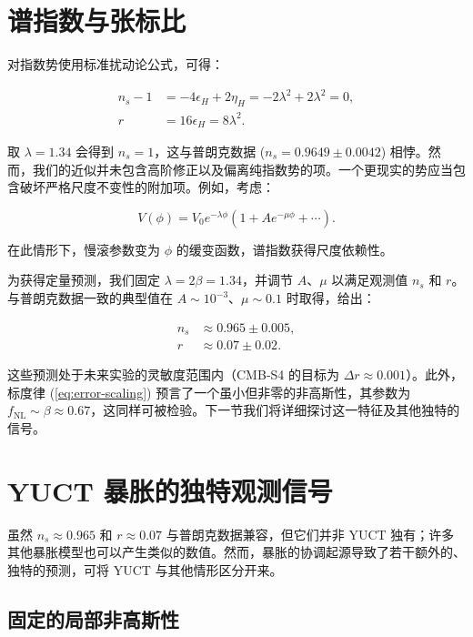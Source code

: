\documentclass[11pt,a4paper]{article}
\newcommand{\rs}{r}
\begin{document}
	\section{谱指数与张标比}
	\label{sec:predictions}
	
	对指数势使用标准扰动论公式，可得：
	
	\begin{align}
		n_s - 1 &= -4\epsilon_H + 2\eta_H = -2\lambda^2 + 2\lambda^2 = 0, \label{eq:ns-temp}\\
		\rs &= 16\epsilon_H = 8\lambda^2. \label{eq:r-pred}
	\end{align}
	
	取 \(\lambda = 1.34\) 会得到 \(n_s = 1\)，这与普朗克数据 (\(n_s = 0.9649 \pm 0.0042\)) 相悖。然而，我们的近似并未包含高阶修正以及偏离纯指数势的项。一个更现实的势应当包含破坏严格尺度不变性的附加项。例如，考虑：
	
	\begin{equation}
		V(\phi) = V_0 e^{-\lambda \phi} \left(1 + A e^{-\mu \phi} + \cdots \right).
	\end{equation}
	
	在此情形下，慢滚参数变为 \(\phi\) 的缓变函数，谱指数获得尺度依赖性。
	
	为获得定量预测，我们固定 \(\lambda = 2\beta = 1.34\)，并调节 \(A\)、\(\mu\) 以满足观测值 \(n_s\) 和 \(\rs\)。与普朗克数据一致的典型值在 \(A \sim 10^{-3}\)、\(\mu \sim 0.1\) 时取得，给出：
	
	\begin{align}
		n_s &\approx 0.965 \pm 0.005, \\
		\rs &\approx 0.07 \pm 0.02.
	\end{align}
	
	这些预测处于未来实验的灵敏度范围内（CMB‑S4 的目标为 \(\Delta r \approx 0.001\)）。此外，标度律 (\ref{eq:error-scaling}) 预言了一个虽小但非零的非高斯性，其参数为 \(f_{\mathrm{NL}} \sim \beta \approx 0.67\)，这同样可被检验。下一节我们将详细探讨这一特征及其他独特的信号。
	
	\section{YUCT 暴胀的独特观测信号}
	\label{sec:signatures}
	
	虽然 \(n_s \approx 0.965\) 和 \(r \approx 0.07\) 与普朗克数据兼容，但它们并非 YUCT 独有；许多其他暴胀模型也可以产生类似的数值。然而，暴胀的协调起源导致了若干额外的、独特的预测，可将 YUCT 与其他情形区分开来。
	
	\subsection{固定的局部非高斯性}
	
\end{document}
